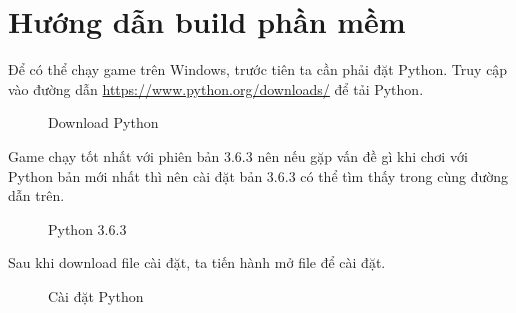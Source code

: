 \section{Hướng dẫn build phần mềm}
Để có thể chạy game trên Windows, trước tiên ta cần phải đặt Python.
Truy cập vào đường dẫn \url{https://www.python.org/downloads/} để tải Python.
\begin{figure}[H]
\caption{Download Python}
\end{figure}
Game chạy tốt nhất với phiên bản 3.6.3 nên nếu gặp vấn đề gì khi chơi với Python bản mới nhất thì nên cài đặt bản 3.6.3 có thể tìm thấy trong cùng đường dẫn trên.
\begin{figure}[H]
\caption{Python 3.6.3}
\end{figure}
Sau khi download file cài đặt, ta tiến hành mở file để cài đặt.
\begin{figure}[H]
\caption{Cài đặt Python}
\end{figure}
